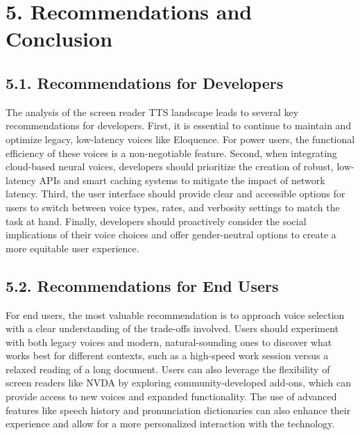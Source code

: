 \section{5. Recommendations and Conclusion}
\subsection{5.1. Recommendations for Developers}
The analysis of the screen reader TTS landscape leads to several key
recommendations for developers. First, it is essential to continue to
maintain and optimize legacy, low-latency voices like Eloquence. For
power users, the functional efficiency of these voices is a
non-negotiable feature. Second, when integrating cloud-based neural
voices, developers should prioritize the creation of robust, low-latency
APIs and smart caching systems to mitigate the impact of network
latency.\supercite{33} Third, the user interface should provide clear and
accessible options for users to switch between voice types, rates, and
verbosity settings to match the task at hand.\supercite{15} Finally, developers
should proactively consider the social implications of their voice
choices and offer gender-neutral options to create a more equitable user
experience.

\subsection{5.2. Recommendations for End Users}
For end users, the most valuable recommendation is to approach voice
selection with a clear understanding of the trade-offs involved. Users
should experiment with both legacy voices and modern, natural-sounding
ones to discover what works best for different contexts, such as a
high-speed work session versus a relaxed reading of a long document.
Users can also leverage the flexibility of screen readers like NVDA by
exploring community-developed add-ons, which can provide access to new
voices and expanded functionality.\supercite{31} The use of advanced features like
speech history and pronunciation dictionaries can also enhance their
experience and allow for a more personalized interaction with the
technology.\supercite{15}

